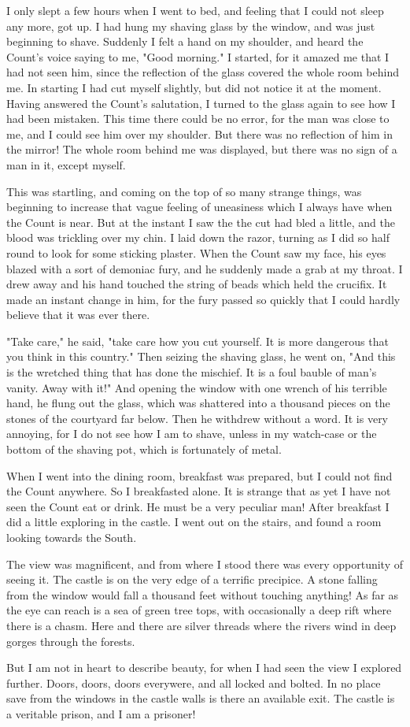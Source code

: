 I only slept a few hours when I went to bed, and feeling that I could not sleep any more, got up. I had hung my shaving glass by the window, and was just beginning to shave. Suddenly I felt a hand on my shoulder, and heard the Count's voice saying to me, "Good morning." I started, for it amazed me that I had not seen him, since the reflection of the glass covered the whole room behind me. In starting I had cut myself slightly, but did not notice it at the moment. Having answered the Count's salutation, I turned to the glass again to see how I had been mistaken. This time there could be no error, for the man was close to me, and I could see him over my shoulder. But there was no reflection of him in the mirror! The whole room behind me was displayed, but there was no sign of a man in it, except myself. 

This was startling, and coming on the top of so many strange things, was beginning to increase that vague feeling of uneasiness which I always have when the Count is near. But at the instant I saw the the cut had bled a little, and the blood was trickling over my chin. I laid down the razor, turning as I did so half round to look for some sticking plaster. When the Count saw my face, his eyes blazed with a sort of demoniac fury, and he suddenly made a grab at my throat. I drew away and his hand touched the string of beads which held the crucifix. It made an instant change in him, for the fury passed so quickly that I could hardly believe that it was ever there. 

"Take care," he said, "take care how you cut yourself. It is more dangerous that you think in this country." Then seizing the shaving glass, he went on, "And this is the wretched thing that has done the mischief. It is a foul bauble of man's vanity. Away with it!" And opening the window with one wrench of his terrible hand, he flung out the glass, which was shattered into a thousand pieces on the stones of the courtyard far below. Then he withdrew without a word. It is very annoying, for I do not see how I am to shave, unless in my watch-case or the bottom of the shaving pot, which is fortunately of metal. 

When I went into the dining room, breakfast was prepared, but I could not find the Count anywhere. So I breakfasted alone. It is strange that as yet I have not seen the Count eat or drink. He must be a very peculiar man! After breakfast I did a little exploring in the castle. I went out on the stairs, and found a room looking towards the South. 

The view was magnificent, and from where I stood there was every opportunity of seeing it. The castle is on the very edge of a terrific precipice. A stone falling from the window would fall a thousand feet without touching anything! As far as the eye can reach is a sea of green tree tops, with occasionally a deep rift where there is a chasm. Here and there are silver threads where the rivers wind in deep gorges through the forests. 

But I am not in heart to describe beauty, for when I had seen the view I explored further. Doors, doors, doors everywere, and all locked and bolted. In no place save from the windows in the castle walls is there an available exit. The castle is a veritable prison, and I am a prisoner! 
